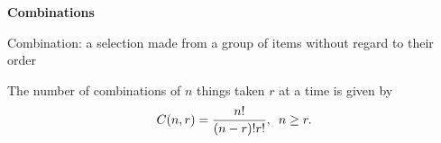 \begin{center}
\textbf{Combinations
}
\end{center}

\vspace*{1ex}

Combination: a selection made from a group of items without regard to their order

\vspce 

The number of combinations of $n$ things taken $r$ at a time is given by
\[
C(n, r) = \displaystyle \frac{n!}{(n-r)!r!}, \hspace*{0.5em} n\geq r. 
\]
